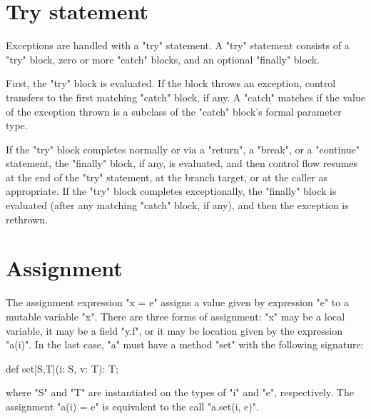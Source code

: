\section{Try statement}

Exceptions are handled with a \xcd"try" statement.
A \xcd"try" statement consists of a \xcd"try" block, zero or more
\xcd"catch" blocks, and an optional \xcd"finally" block.

First, the \xcd"try" block is evaluated.  If the block throws an
exception, control transfers to the first matching \xcd"catch"
block, if any.  A \xcd"catch" matches if the value of the
exception thrown is a subclass of the \xcd"catch" block's formal
parameter type.

If the \xcd"try" block completes normally
or via a \xcd"return", a \xcd"break", or a
\xcd"continue" statement, 
the \xcd"finally"
block, if any, is evaluated, and then control flow resumes at
the end of the \xcd"try" statement, at the branch target, or at
the caller as appropriate.
If the \xcd"try" block completes
exceptionally, the \xcd"finally" block is evaluated (after any
matching \xcd"catch" block, if any), and then the
exception is rethrown.

\section{Assignment}\label{AssignmentStatement}

%

The assignment expression \xcd"x = e" assigns a value given by
expression \xcd"e"
to a mutable variable \xcd"x".  There are three forms of
assignment: \xcd"x" may be a local variable, it may be a field
\xcd"y.f", or it may be location given by the expression \xcd"a(i)".
In the last case, \xcd"a" must have a method \xcd"set" with the
following signature:
\begin{xten}
def set[S,T](i: S, v: T): T;
\end{xten}

\noindent where \xcd"S" and \xcd"T" are instantiated on the
types of \xcd"i" and \xcd"e", respectively.
The assignment \xcd"a(i) = e" is equivalent to the call
\xcd"a.set(i, e)".

